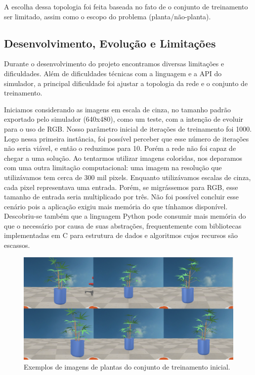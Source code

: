 \documentclass[twoside,conference,a4paper]{IEEEtran}
\begin{document}
A escolha dessa topologia foi feita baseada no fato de o conjunto de treinamento ser limitado, assim como o escopo do problema (planta/não-planta). 

\subsection{Desenvolvimento, Evolução e Limitações}
Durante o desenvolvimento do projeto encontramos diversas limitações e dificuldades. Além de dificuldades técnicas com a linguagem e a API do simulador, a principal dificuldade foi ajustar a topologia da rede e o conjunto de treinamento.

Iniciamos considerando as imagens em escala de cinza, no tamanho padrão exportado pelo simulador (640x480), como um teste, com a intenção de evoluir para o uso de RGB. Nosso parâmetro inicial de iterações de treinamento foi 1000. Logo nessa primeira instância, foi possível perceber que esse número de iterações não seria viável, e então o reduzimos para 10. Porém a rede não foi capaz de chegar a uma solução. Ao tentarmos utilizar imagens coloridas, nos deparamos com uma outra limitação computacional: uma imagem na resolução que utilizávamos tem cerca de 300 mil pixels. Enquanto utilizávamos escalas de cinza, cada pixel representava uma entrada. Porém, se migrássemos para RGB, esse tamanho de entrada seria multiplicado por três. Não foi possível concluir esse cenário pois a aplicação exigiu mais memória do que tínhamos disponível. Descobriu-se também
que a linguagem Python pode consumir mais memória do que o necessário por causa de suas abstrações, frequentemente com bibliotecas implementadas em C para estrutura de dados e algoritmos cujos recursos são escassos.

\begin{figure}[ht]
\centering
\includegraphics[width=1\hsize]{figuras/exemploconj1.png}
\caption{Exemplos de imagens de plantas do conjunto de treinamento inicial.}
\label{fig:fig2}
\end{figure}
\end{document}
